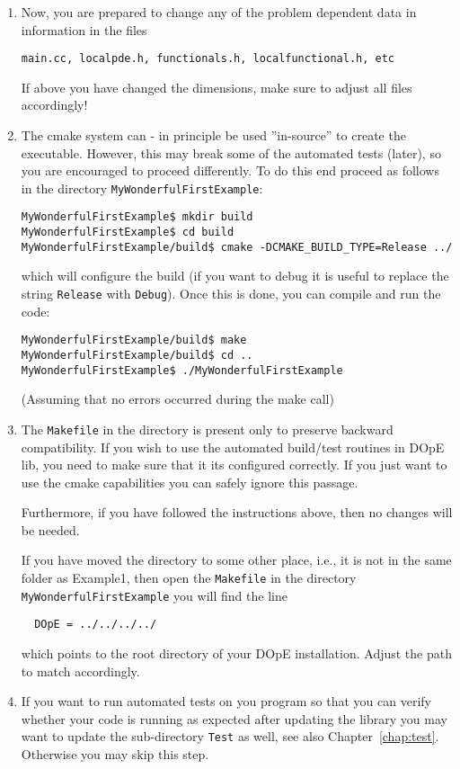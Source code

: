 \begin{enumerate}
\item  Now, you are prepared to change any of the problem
  dependent data in information in the files 
\begin{verbatim}
main.cc, localpde.h, functionals.h, localfunctional.h, etc
\end{verbatim} 
If above you have changed the dimensions, make sure to adjust all
files accordingly!

\item The cmake system can - in principle be used
  ''in-source'' to create the executable. 
  However, this may break some of the automated tests (later),
  so you are encouraged to proceed differently. To do this end
  proceed as follows in the directory \texttt{MyWonderfulFirstExample}:
  \begin{verbatim}
MyWonderfulFirstExample$ mkdir build
MyWonderfulFirstExample$ cd build
MyWonderfulFirstExample/build$ cmake -DCMAKE_BUILD_TYPE=Release ../
\end{verbatim}
which will configure the build (if you want to debug it is useful to
replace the string \texttt{Release} with \texttt{Debug}). 
Once this is done, you can compile and run the code:
\begin{verbatim}
MyWonderfulFirstExample/build$ make 
MyWonderfulFirstExample/build$ cd ..
MyWonderfulFirstExample$ ./MyWonderfulFirstExample
\end{verbatim}
(Assuming that no errors occurred during the make call)

\item The \texttt{Makefile} in the directory is present only to
  preserve backward compatibility. If you wish to use the automated
  build/test routines in DOpE lib, you need to make sure that it its
  configured correctly. If you just want to use the cmake capabilities 
  you can safely ignore this passage.

  Furthermore, if you have followed the instructions above, then no
  changes will be needed.

  If you have moved the directory to some other place, i.e., it is not
  in the same folder as Example1, then open the \texttt{Makefile} 
  in the directory \texttt{MyWonderfulFirstExample}
  you will find the line 
  \begin{verbatim}
  DOpE = ../../../../
  \end{verbatim}
  which points to the root directory of your DOpE installation.
  Adjust the path to match accordingly.

\item If you want to run automated tests on you program so that you can 
  verify whether your code is running as expected after updating the 
  library you may want to update the sub-directory \texttt{Test} 
  as well, see also Chapter~\ref{chap:test}. Otherwise you may skip this 
  step.


\end{enumerate}
